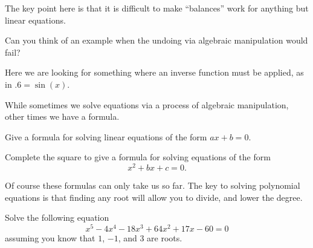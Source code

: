 \begin{teachingnote}
The key point here is that it is difficult to make ``balances'' work
for anything but linear equations.
\end{teachingnote}



\begin{prob}
Can you think of an example when the undoing via algebraic
manipulation would fail?
\end{prob}

\begin{teachingnote}
Here we are looking for something where an inverse function must be
applied, as in $.6 = \sin(x)$.
\end{teachingnote}


While sometimes we solve equations via a process of algebraic
manipulation, other times we have a formula.


\begin{prob}
Give a formula for solving linear equations of the form $ax + b =0$.
\end{prob}


\begin{prob}
Complete the square to give a formula for solving equations of the form
\[
x^2 + bx + c = 0.
\]
\end{prob}


Of course these formulas can only take us so far. The key to solving
polynomial equations is that finding any root will allow you to
divide, and lower the degree.

\begin{prob}
Solve the following equation
\[
x^5 - 4x^4 - 18x^3 + 64x^2 + 17x -60 = 0
\]
assuming you know that $1$, $-1$, and $3$ are roots.
\end{prob}


